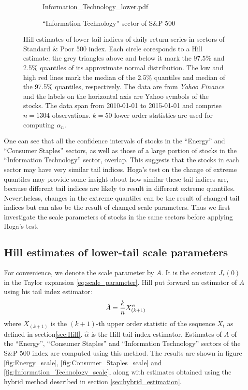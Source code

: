 \documentclass{article}
\begin{document}
\begin{figure}[htb!]
\begin{subfigure}[b]{\linewidth}
                    {Information_Technology_lower.pdf}
    \caption{``Information Technology'' sector of S\&P 500}
    \label{fig:Information_Technology_lower}
  \end{subfigure}
  \caption{\small Hill estimates of lower tail indices of
    daily return series in sectors of Standard \& Poor
    500 index. Each circle coresponds to a Hill estimate; the grey
    triangles above and below it mark the 97.5\% and 2.5\% quantiles
    of its approximate normal distribution.
    The low and high red lines mark the median of the 2.5\% quantiles
    and median of the 97.5\% quantiles, respectively.
    The data are from {\it Yahoo Finance} and the labels on
    the horizontal axis are Yahoo symbols of the stocks. The data span
    from 2010-01-01 to 2015-01-01 and comprise $n=1304$
    observations. $k=50$ lower order statistics are used
    for computing $\alpha_n$. 
  }
\end{figure}
One can see that all the confidence intervals of stocks in the
``Energy'' and ``Consumer Staples'' sectors, as well as those of a
large portion of stocks in the ``Information Technology'' sector,
overlap. This suggests that the stocks in each sector may have very
similar tail indices. Hoga's test on the change of extreme quantiles
may provide some insight about how similar these tail indices are,
because different tail indices are likely to result in different
extreme quantiles. Nevertheless, changes in the extreme quantiles can
be the result of changed tail indices but can also be the result of
changed scale parameters. Thus we first investigate the scale
parameters of stocks in the same sectors before applying Hoga's test.

\subsection{Hill estimates of lower-tail scale parameters}
\label{sec:HillScaleEstimates}

For convenience, we denote the scale parameter by $A$. It is the
constant $J_*(0)$ in the Taylor expansion \eqref{eq:scale_parameter}.
Hill \cite{hill1975simple} put forward an estimator of $A$ using his
tail index  estimator:
\[
\hat A = {k \over n} X_{(k+1)}^{\hat \alpha}
\]
where $X_{(k+1)}$ is the $(k+1)$-th upper order statistic of the
sequence $X_t$ as defined in section\ref{sec:Hill}. $\hat \alpha$
is the Hill tail index estimator.
Estimates of $A$ of the ``Energy'', ``Consumer Staples'' and
``Information Technology'' sectors of the S\&P 500 index are computed
using this method. The results are shown in figure \ref{fig:Energy_scale},
\ref{fig:Consumer_Staples_scale} and
\ref{fig:Information_Technology_scale}, along with estimates obtained
using the hybrid method described in section
\ref{sec:hybrid_estimation}.
\end{document}
